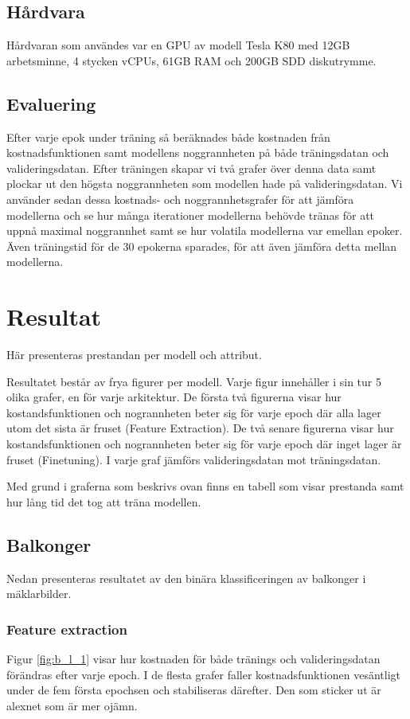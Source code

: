 \documentclass[]{kththesis}
\begin{document}
\section{Hårdvara}
Hårdvaran som användes var en GPU av modell Tesla K80 med 12GB arbetsminne, 4 stycken vCPUs, 61GB RAM och 200GB SDD diskutrymme.

\section{Evaluering}
Efter varje epok under träning så beräknades både kostnaden från kostnadsfunktionen samt modellens noggrannheten på både träningsdatan och valideringsdatan. Efter träningen skapar vi två grafer över denna data samt plockar ut den högsta noggrannheten som modellen hade på valideringsdatan. Vi använder sedan dessa kostnads- och noggrannhetsgrafer för att jämföra modellerna och se hur många iterationer modellerna behövde tränas för att uppnå maximal noggrannhet samt se hur volatila modellerna var emellan epoker. Även träningstid för de 30 epokerna sparades, för att även jämföra detta mellan modellerna.

\chapter{Resultat}
Här presenteras prestandan per modell och attribut.

Resultatet består av frya figurer per modell. 
Varje figur innehåller i sin tur 5 olika grafer, en för varje arkitektur.
De första två figurerna visar hur kostandsfunktionen och nogrannheten beter sig för varje epoch där alla lager utom det sista är fruset (Feature Extraction).
De två senare figurerna visar hur kostandsfunktionen och nogrannheten beter sig för varje epoch där inget lager är fruset (Finetuning).
I varje graf jämförs valideringsdatan mot träningsdatan.

Med grund i graferna som beskrivs ovan finns en tabell som visar prestanda samt hur lång tid det tog att träna modellen.

\section{Balkonger}
Nedan presenteras resultatet av den binära klassificeringen av balkonger i mäklarbilder.


\subsection{Feature extraction}
Figur \ref{fig:b_l_1} visar hur kostnaden för både tränings och valideringsdatan förändras efter varje epoch. 
I de flesta grafer faller kostnadsfunktionen vesäntligt under de fem första epochsen och stabiliseras därefter.
Den som sticker ut är alexnet som är mer ojämn.
\end{document}
